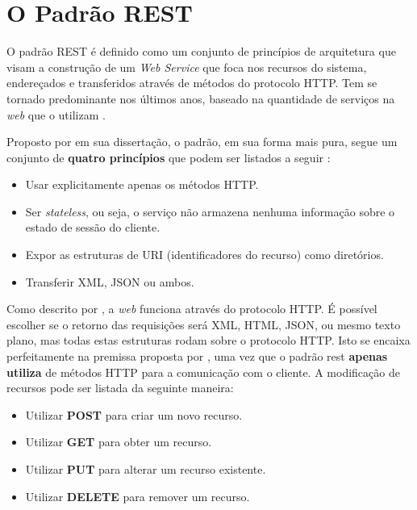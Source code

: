 \section{O Padrão REST}

O padrão REST é definido como um conjunto de princípios de arquitetura que visam a construção de um \textit{Web Service} que foca nos recursos do sistema, endereçados e transferidos através de métodos do protocolo HTTP. Tem se tornado predominante nos últimos anos, baseado na quantidade de serviços na \textit{web} que o utilizam \cite{rodriguez2008restful}.

Proposto por  em sua dissertação, o padrão, em sua forma mais pura, segue um conjunto de \textbf{quatro princípios} que podem ser listados a seguir \cite{rodriguez2008restful}:

\begin{itemize}
	\item Usar explicitamente apenas os métodos HTTP.

	\item Ser \textit{stateless}, ou seja, o serviço não armazena nenhuma informação sobre o estado de sessão do cliente.

	\item Expor as estruturas de URI (identificadores do recurso) como diretórios.

	\item Transferir XML, JSON ou ambos.
\end{itemize}

Como descrito por , a \textit{web} funciona através do protocolo HTTP. É possível escolher se o retorno das requisições será XML, HTML, JSON, ou mesmo texto plano, mas todas estas estruturas rodam sobre o protocolo HTTP. Isto se encaixa perfeitamente na premissa proposta por , uma vez que o padrão rest \textbf{apenas utiliza} de métodos HTTP para a comunicação com o cliente. A modificação de recursos pode ser listada da seguinte maneira:

\begin{itemize}
	\item Utilizar \textbf{POST} para criar um novo recurso.

	\item Utilizar \textbf{GET} para obter um recurso.

	\item Utilizar \textbf{PUT} para alterar um recurso existente.

	\item Utilizar \textbf{DELETE} para remover um recurso.
\end{itemize}

